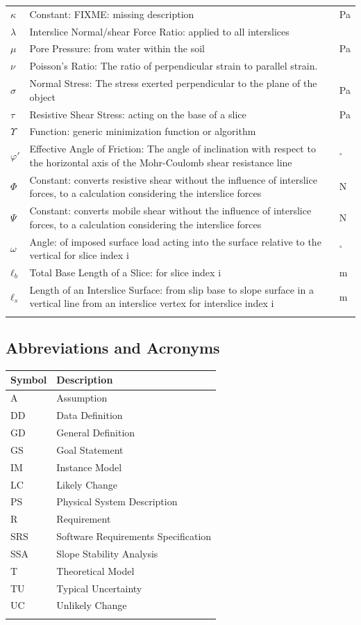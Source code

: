 \documentclass[12pt]{article}
\begin{document}
\begin{longtabu}{l X[l] l}
$κ$ & Constant: FIXME: missing description & Pa
\\
$λ$ & Interslice Normal/shear Force Ratio: applied to all interslices & 
\\
$μ$ & Pore Pressure: from water within the soil & Pa
\\
$ν$ & Poisson's Ratio: The ratio of perpendicular strain to parallel strain. & 
\\
$σ$ & Normal Stress: The stress exerted perpendicular to the plane of the object & Pa
\\
$τ$ & Resistive Shear Stress: acting on the base of a slice & Pa
\\
$Υ$ & Function: generic minimization function or algorithm & 
\\
$φ'$ & Effective Angle of Friction: The angle of inclination with respect to the horizontal axis of the Mohr-Coulomb shear resistance line & ${}^{\circ}$
\\
$Φ$ & Constant: converts resistive shear without the influence of interslice forces, to a calculation considering the interslice forces & N
\\
$Ψ$ & Constant: converts mobile shear without the influence of interslice forces, to a calculation considering the interslice forces & N
\\
$ω$ & Angle: of imposed surface load acting into the surface relative to the vertical for slice index i & ${}^{\circ}$
\\
${ℓ_{b}}$ & Total Base Length of a Slice: for slice index i & m
\\
${ℓ_{s}}$ & Length of an Interslice Surface: from slip base to slope surface in a vertical line from an interslice vertex for interslice index i & m
\\
\bottomrule
\label{Table:ToS}
\end{longtabu}
\subsection{Abbreviations and Acronyms}
\label{Sec:TAbbAcc}
\begin{longtable*}{l l}
\toprule
Symbol & Description
\\
\midrule
A & Assumption
\\
DD & Data Definition
\\
GD & General Definition
\\
GS & Goal Statement
\\
IM & Instance Model
\\
LC & Likely Change
\\
PS & Physical System Description
\\
R & Requirement
\\
SRS & Software Requirements Specification
\\
SSA & Slope Stability Analysis
\\
T & Theoretical Model
\\
TU & Typical Uncertainty
\\
UC & Unlikely Change
\\
\bottomrule
\label{Table:TAbbAcc}
\end{longtable*}
\end{document}
